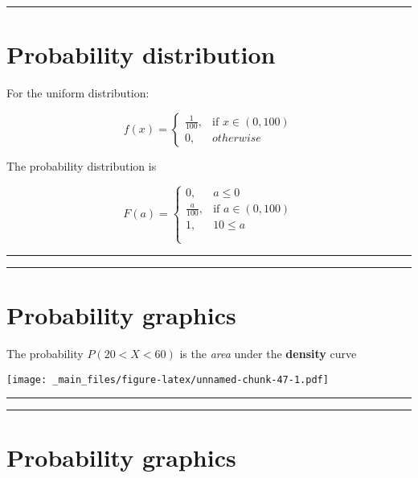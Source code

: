 \documentclass[
]{book}
\begin{document}
\begin{center}\rule{0.5\linewidth}{0.5pt}\end{center}

\hypertarget{probability-distribution-5}{%
\section{Probability distribution}\label{probability-distribution-5}}

For the uniform distribution:

\[
    f(x)= 
\begin{cases}
    \frac{1}{100},& \text{if } x\in (0,100)\\
    0,& otherwise 
\end{cases}
\]

The probability distribution is

\[
    F(a)= 
\begin{cases}
    0,& a \leq 0 \\
    \frac{a}{100},& \text{if } a\in (0,100)\\
    1, & 10 \leq a \\
    \\
\end{cases}
\]

\begin{center}\rule{0.5\linewidth}{0.5pt}\end{center}

\begin{center}\rule{0.5\linewidth}{0.5pt}\end{center}

\hypertarget{probability-graphics}{%
\section{Probability graphics}\label{probability-graphics}}

The probability \(P(20<X<60)\) is the \emph{area} under the \textbf{density} curve

\texttt{[image: \_main\_files/figure-latex/unnamed-chunk-47-1.pdf]}

\begin{center}\rule{0.5\linewidth}{0.5pt}\end{center}

\begin{center}\rule{0.5\linewidth}{0.5pt}\end{center}

\hypertarget{probability-graphics-1}{%
\section{Probability graphics}\label{probability-graphics-1}}
\end{document}
